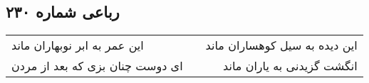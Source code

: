 \begin{center}
\section*{رباعی شماره ۲۳۰}
\label{sec:sh230}
\begin{longtable}{l p{0.5cm} r}
این عمر به ابر نوبهاران ماند
&&
این دیده به سیل کوهساران ماند
\\
ای دوست چنان بزی که بعد از مردن
&&
انگشت گزیدنی به یاران ماند
\\
\end{longtable}
\end{center}
